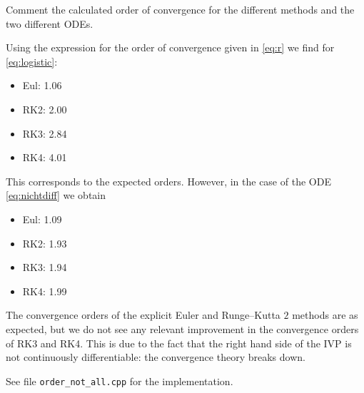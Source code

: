 \begin{problem}
\begin{subproblem}[2]
Comment the calculated order of convergence for the different methods and the two different ODEs.
\begin{solution}
Using the expression for the order of convergence given in \eqref{eq:r} we find for \eqref{eq:logistic}:
\begin{itemize}\setlength\itemsep{0pt}
	\item Eul: 1.06
	\item RK2: 2.00
	\item RK3: 2.84
	\item RK4: 4.01
\end{itemize}
This corresponds to the expected orders. However, in the case of the ODE \eqref{eq:nichtdiff} we obtain
\begin{itemize}\setlength\itemsep{0pt}
	\item Eul: 1.09
	\item RK2: 1.93
	\item RK3: 1.94
	\item RK4: 1.99
\end{itemize}
The convergence orders of the explicit Euler and Runge--Kutta $2$ methods are as expected, but we do not see any relevant improvement in the convergence orders of RK3 and RK4. This is due to the fact that the right hand side of the IVP is not continuously differentiable: the convergence theory breaks down.

See file \texttt{order\_not\_all.cpp} for the implementation.
\end{solution}
\end{subproblem}

\end{problem}
